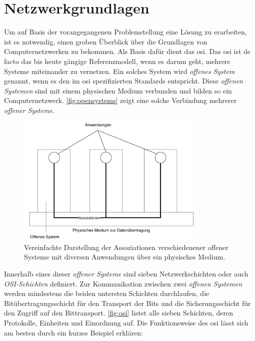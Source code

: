 \documentclass[titlepage]{report}
\begin{document}
\section*{Netzwerkgrundlagen}
Um auf Basis der vorangegangenen Problemstellung eine Lösung zu
erarbeiten, ist es notwendig, einen groben Überblick über die Grundlagen
von Computernetzwerken zu bekommen. Als Basis dafür dient das \gls{osi}. Das
\gls{osi} ist de facto das bis heute gängige Referenzmodell, wenn es
darum geht, mehrere Systeme miteinander zu vernetzen. Ein solches System
wird \emph{offenes System} genannt, wenn es den im \gls{osi}
spezifizierten Standards entspricht\cite[Siehe Abschnitt
4.1.2]{ITUOSI}. Diese \emph{offenen Systemen} sind mit einem physischen
Medium verbunden und bilden so ein Computernetzwerk. \autoref{fig:opensystems}
zeigt eine solche Verbindung mehrerer \emph{offener Systeme}.
\begin{figure}[H]
    \centering
    \includegraphics[width=0.8\textwidth]{figures/open_systems.pdf}
    \caption{Vereinfachte Darstellung der Assoziationen verschiedenener offener
    Systeme mit diversen Anwendungen über ein physisches Medium.}\label{fig:opensystems}
\end{figure}
Innerhalb eines dieser \emph{offener Systeme} sind sieben
Netzwerkschichten oder auch \emph{OSI-Schichten} definiert\cite[Siehe
Abschnitt 6.1.2]{ITUOSI}. Zur
Kommunikation zwischen zwei \emph{offenen Systemen} werden mindestens
die beiden untersten Schichten durchlaufen, die Bitübertragungsschicht
für den Transport der Bits und die Sicherungsschicht für den Zugriff auf
den Bittransport.
\autoref{fig:osi} listet alle sieben Schichten, deren Protokolle,
Einheiten und Einordnung auf. Die Funktionsweise des \gls{osi} lässt
sich am besten durch ein kurzes Beispiel erklären:
\end{document}
